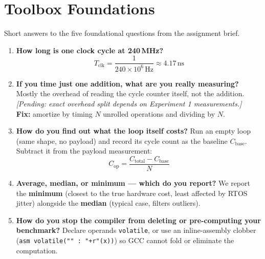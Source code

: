 \section{Toolbox Foundations}
Short answers to the five foundational questions from the assignment brief.

\begin{enumerate}[leftmargin=1.8em, itemsep=6pt]
    \item \textbf{How long is one clock cycle at 240\,MHz?}
    \begin{equation}
        T_{\text{clk}} = \frac{1}{240 \times 10^6\,\text{Hz}} \approx 4.17\,\text{ns}
    \end{equation}

    \item \textbf{If you time just one addition, what are you really measuring?}
    Mostly the overhead of reading the cycle counter itself, not the addition. \textit{[Pending: exact overhead split depends on Experiment 1 measurements.]} \\
    \textbf{Fix:} amortize by timing $N$ unrolled operations and dividing by $N$.

    \item \textbf{How do you find out what the loop itself costs?}
    Run an empty loop (same shape, no payload) and record its cycle count as the baseline $C_{\text{base}}$. Subtract it from the payload measurement:
    \begin{equation}
        C_{\text{op}} = \frac{C_{\text{total}} - C_{\text{base}}}{N}
    \end{equation}

    \item \textbf{Average, median, or minimum — which do you report?}
    We report the \textbf{minimum} (closest to the true hardware cost, least affected by RTOS jitter) alongside the \textbf{median} (typical case, filters outliers).

    \item \textbf{How do you stop the compiler from deleting or pre-computing your benchmark?}
    Declare operands \texttt{volatile}, or use an inline-assembly clobber (\texttt{asm volatile("" : "+r"(x))}) so GCC cannot fold or eliminate the computation.
\end{enumerate}
